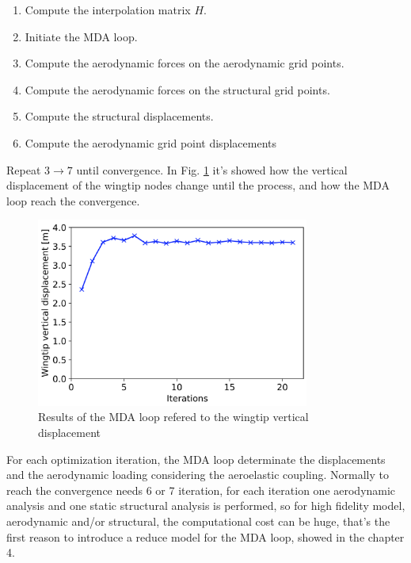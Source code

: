 \begin{enumerate}
	\item Compute the interpolation matrix $H$.
	\item Initiate the MDA loop.
	\item Compute the aerodynamic forces on the aerodynamic grid points.
	\item Compute the aerodynamic forces on the structural grid points.
	\item Compute the structural displacements.
	\item Compute the aerodynamic grid point displacements
\end{enumerate}
Repeat $3\rightarrow 7$ until convergence.
In Fig. \ref{fig:2_7} it's showed how the vertical displacement of the wingtip nodes change until the process, and how the MDA loop reach the convergence. 
\begin{figure}[H]
	\centering
	\includegraphics[width = 0.8\textwidth]{./Immagini/2_7.png}
	\caption{Results of the MDA loop refered to the wingtip vertical displacement }
	\label{fig:2_7}
\end{figure}
For each optimization iteration, the MDA loop determinate the displacements and the aerodynamic loading considering the aeroelastic coupling. Normally to reach the convergence needs 6 or 7 iteration, for each iteration one aerodynamic analysis and one static structural analysis is performed, so for high fidelity model, aerodynamic and/or structural, the computational cost can be huge, that's the first reason to introduce a reduce model for the MDA loop, showed in the chapter 4.